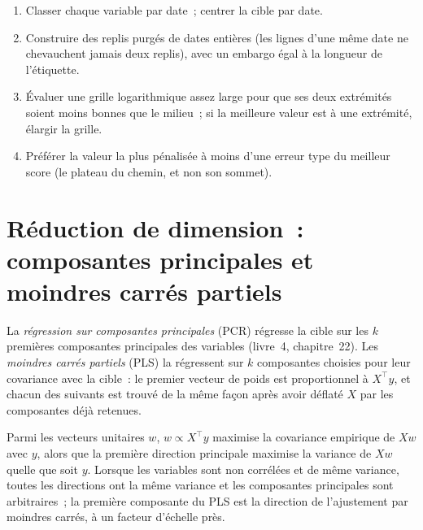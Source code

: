 \begin{method}\label{met:ml:baselines:penalty}
\begin{enumerate}
\item Classer chaque variable par date~; centrer la cible par date.
\item Construire des replis purgés de dates entières (les lignes d'une même date ne chevauchent jamais deux replis), avec un embargo égal à la longueur de l'étiquette.
\item Évaluer une grille logarithmique assez large pour que ses deux extrémités soient moins bonnes que le milieu~; si la meilleure valeur est à une extrémité,
élargir la grille.
\item Préférer la valeur la plus pénalisée à moins d'une erreur type du meilleur score (le plateau du chemin, et non son sommet).
\end{enumerate}
\end{method}

\section{Réduction de dimension~: composantes principales et moindres carrés partiels}

\begin{definition}\label{def:ml:linear-and-regularised-baselines:pcr}
La \emph{régression sur composantes principales} (PCR) régresse la cible sur les
$k$ premières composantes principales des variables (livre~4, chapitre~22). Les \emph{moindres carrés partiels}
(PLS) la régressent sur $k$ composantes choisies pour leur covariance avec la cible~: le premier vecteur de poids est
proportionnel à $X^\top y$, et chacun des suivants est trouvé de la même façon après avoir déflaté $X$ par les composantes déjà
retenues.
\end{definition}

\begin{proposition}\label{prop:ml:baselines:pls}
Parmi les vecteurs unitaires $w$, $w\propto X^\top y$ maximise la covariance empirique de $Xw$ avec $y$, alors que la première direction principale
maximise la variance de $Xw$ quelle que soit $y$. Lorsque les variables sont non corrélées et de même variance, toutes les directions
ont la même variance et les composantes principales sont arbitraires~; la première composante du PLS est la direction de l'ajustement
par moindres carrés, à un facteur d'échelle près.
\end{proposition}

